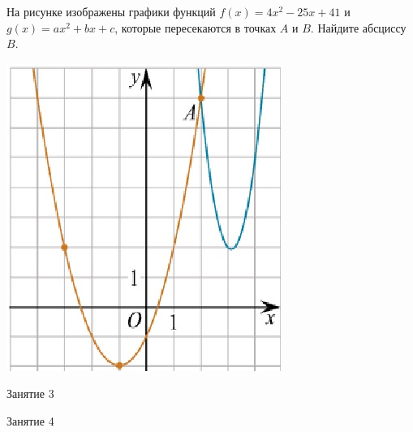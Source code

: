 \begin{homework}[number=1]
\begin{listofex}
\begin{minipage}[t]{\picwidth}
		\end{minipage}
		\item 
		\begin{minipage}[t]{\bodywidth}
			На рисунке изображены графики функций \( f(x)=4x^2-25x+41 \) и \( g(x)=ax^2+bx+c \), которые пересекаются в точках \(A\) и \(B\). Найдите абсциссу  \( B \).
		\end{minipage}
		\begin{minipage}[t]{\picwidth}
			\includegraphics[align=t, width=\linewidth]{../../pics/G111M3PP-1}
		\end{minipage}
	\end{listofex}
\end{homework}

\begin{class}[number=3]
	\begin{listofex}
		\item Занятие 3
	\end{listofex}
\end{class}

\begin{class}[number=4]
	\begin{listofex}
		\item Занятие 4
	\end{listofex}
\end{class}


